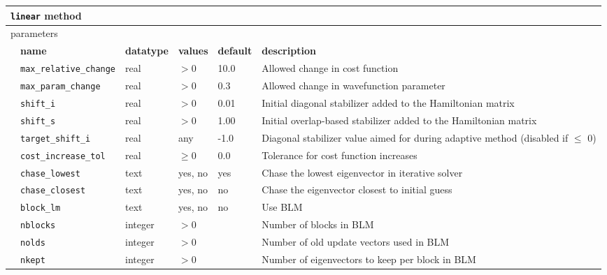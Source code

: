 \begin{table}[h]
\begin{center}
\begin{tabularx}{\textwidth}{l l l l l X }
\hline
\multicolumn{6}{l}{\texttt{linear} method} \\
\hline
\multicolumn{2}{l}{parameters}  & \multicolumn{4}{l}{}\\
   &   \bfseries name     & \bfseries datatype & \bfseries values & \bfseries default   & \bfseries description \\
   &   \texttt{max\_relative\_change} &  real     & $>0$ & 10.0 & Allowed change in cost function\\
   &   \texttt{max\_param\_change} &  real     & $>0$ & 0.3 & Allowed change in wavefunction parameter\\
   &   \texttt{shift\_i} &  real     & $>0$ & 0.01 & Initial diagonal      stabilizer added to the Hamiltonian matrix\\
   &   \texttt{shift\_s} &  real     & $>0$ & 1.00 & Initial overlap-based stabilizer added to the Hamiltonian matrix\\
   &   \texttt{target\_shift\_i} &  real     & any & -1.0 & Diagonal stabilizer value aimed for during adaptive method (disabled if $\leq$ 0)\\
   &   \texttt{cost\_increase\_tol} &  real     & $\geq 0$ & 0.0 & Tolerance for cost function increases\\
   &   \texttt{chase\_lowest} &  text   & yes, no & yes & Chase the lowest eigenvector in iterative solver\\
   &   \texttt{chase\_closest} &  text   & yes, no & no & Chase the eigenvector closest to initial guess\\
   &   \texttt{block\_lm} &  text   & yes, no & no & Use BLM\\
   &   \texttt{nblocks} &  integer   & $>0$ &  & Number of blocks in BLM\\
   &   \texttt{nolds} &  integer   & $>0$ &  & Number of old update vectors used in BLM\\
   &   \texttt{nkept} &  integer   & $>0$ &  & Number of eigenvectors to keep per block in BLM\\
  \hline
\end{tabularx}
\end{center}
\end{table}

